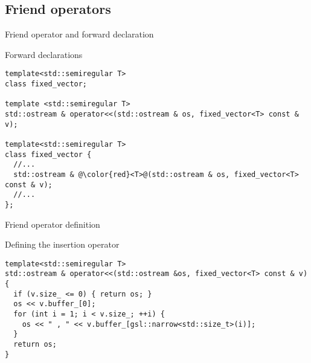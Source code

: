 \subsection{Friend operators}

\begin{frame}[t,fragile]{Friend operator and forward declaration}

\begin{block}{Forward declarations}
\begin{lstlisting}[escapechar=@]
template<std::semiregular T>
class fixed_vector;

template <std::semiregular T>
std::ostream & operator<<(std::ostream & os, fixed_vector<T> const & v);

template<std::semiregular T>
class fixed_vector {
  //...
  std::ostream & @\color{red}<T>@(std::ostream & os, fixed_vector<T> const & v);
  //...
};
\end{lstlisting}
\end{block}

\end{frame}

\begin{frame}[t,fragile]{Friend operator definition}
\begin{block}{Defining the insertion operator}
\begin{lstlisting}
template<std::semiregular T>
std::ostream & operator<<(std::ostream &os, fixed_vector<T> const & v) {
  if (v.size_ <= 0) { return os; }
  os << v.buffer_[0];
  for (int i = 1; i < v.size_; ++i) {
    os << " , " << v.buffer_[gsl::narrow<std::size_t>(i)];
  }
  return os;
}
\end{lstlisting}
\end{block}
\end{frame}

